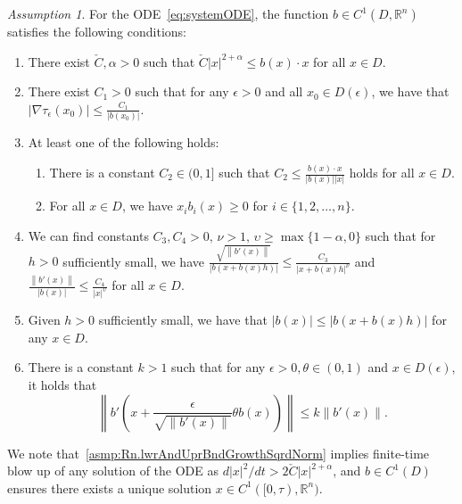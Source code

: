 \documentclass[a4paper, oneside, reqno]{amsart}
\newcommand{\abs}[1]{\left\lvert#1\right\rvert}
\newcommand{\norm}[1]{\left\|#1\right\|}
\newcommand{\R}{\mathbb{R}}
\theoremstyle{remark}
\newtheorem{assumption}{Assumption}
\renewcommand{\theassumption}{\Alph{assumption}}
\begin{document}
\begin{assumption}
\label{asmp:Rn}
For the ODE~\eqref{eq:systemODE}, the function \(b\in C^1(D, \R^n)\) 
satisfies the following conditions:
        \begin{enumerate}[label=\arabic*), ref=(\theassumption.\arabic*)]
        \item There exist \(\check{C}, \alpha > 0\) such that \(\check C \abs{x}^{2+\alpha} \leq b(x)\cdot x\) for all \(x \in D\).\label{asmp:Rn.lwrAndUprBndGrowthSqrdNorm}
        
        \item There exist \(C_1 > 0\) such that for any \(\epsilon>0\) and all \(x_0 \in D(\epsilon)\), we have that \(\abs{\nabla \tau_\epsilon(x_0)} \leq \frac{C_1}{\abs{b(x_0)}}\). \label{asmp:Rn.BndGradTau}
        
        \item At least one of the following holds:
        \begin{enumerate}[label=\alph*), ref=(\theassumption.3\alph*)]
            \item There is a constant \(C_2 \in (0,1]\) such that \(C_2 \leq \frac{b(x)\cdot x}{\abs{b(x)}\abs{x}}\) holds for all \(x\in D\).\label{asmp:Rn.directionalityOfB.ineq}
            \item For all \(x\in D\), we have \(x_ib_i(x)\geq0\) for \(i \in \{1, 2, \hdots, n\}\).\label{asmp:Rn.directionalityOfB.sign}
        \end{enumerate}
        \label{asmp:Rn.directionalityOfB}
        
        \item We can find constants \(C_3, C_4 >0,\, \nu>1,\, \upsilon \geq \max\{1-\alpha, 0\}\) such that for \(h>0\) sufficiently small, we have \(\frac{\sqrt{\norm{b'(x)}}}{\abs{b(x+b(x)h)}} \leq \frac{C_3}{\abs{x + b(x)h}^\nu}\) and \(\frac{\norm{b'(x)}}{\abs{b(x)}} \leq \frac{C_4}{\abs{x}^\upsilon}\) for all \(x \in D\).
        \label{asmp:Rn.bDerOverBBound}
        \item Given \(h>0\) sufficiently small, we have that \(\abs{b(x)} \leq \abs{b(x + b(x)h)}\) for any \(x \in D\). \label{asmp:Rn.bndNormBDirection}
        \item There is a constant \(k>1\) such that for any \(\epsilon>0, \theta\in(0,1)\) and \( x\in D(\epsilon)\), it holds that
        \[\norm{b'\left(x + \frac{\epsilon}{\sqrt{\norm{b'(x)}}}\theta b(x)\right)} \leq k\norm{b'(x)}.\] \label{asmp:Rn.bndBdNextByPrev}
    \end{enumerate}
\end{assumption}
We note that~\ref{asmp:Rn.lwrAndUprBndGrowthSqrdNorm} implies finite-time blow up of any solution of the ODE as $d |x|^2/dt > 2\check C |x|^{2+\alpha}$, and $b \in C^1(D)$ ensures there exists a unique solution $x\in C^1([0,\tau), \R^n)$.
\end{document}
